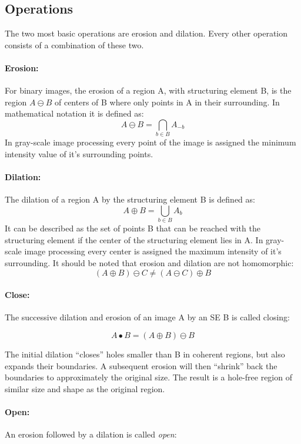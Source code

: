 \documentclass[runningheads,a4paper]{llncs}
\begin{document}
\subsection{Operations}
The two most basic operations are erosion and dilation. Every other operation
consists of a combination of these two.  

\paragraph{Erosion:}
For binary images, the erosion of a region A, with structuring element B, is the
region \(A \ominus B\) of centers of B where only points in A in their surrounding. In mathematical notation it is
defined as:
\[A \ominus B = \bigcap_{b \in B} A_{-b}\]
In gray-scale image processing
every point of the image is assigned the minimum intensity value of it's
surrounding points.

\paragraph{Dilation:}
The dilation of a region A by the structuring element B is defined as:
\[A \oplus B = \bigcup_{b \in B} A_{b}\]
It can be described as the set of points B that can be
reached with the structuring element if the center of the structuring element
lies in A. In gray-scale image processing every center is assigned the maximum
intensity of it's surrounding.
It should be noted that erosion and dilation are not homomorphic:
\[(A \oplus B) \ominus C \neq (A
\ominus C) \oplus B\]

\paragraph{Close:}
The successive dilation and erosion of an image A by an SE B is called closing:

\[ A \bullet B = (A \oplus B) \ominus B \]

The initial dilation ``closes'' holes smaller than B in coherent regions, but also
expands their boundaries. A subsequent erosion will then ``shrink'' back the
boundaries to approximately the original size. The result is a hole-free region of
similar size and shape as the original region.
 
\paragraph{Open:}
An erosion followed by a dilation is called \emph{open}:
\end{document}
